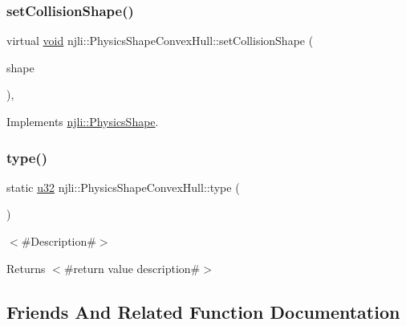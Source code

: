 \subsubsection{\texorpdfstring{set\+Collision\+Shape()}{setCollisionShape()}}
{\footnotesize\ttfamily virtual \mbox{\hyperlink{_thread_8h_af1e856da2e658414cb2456cb6f7ebc66}{void}} njli\+::\+Physics\+Shape\+Convex\+Hull\+::set\+Collision\+Shape (\begin{DoxyParamCaption}\item[{const bt\+Collision\+Shape \&}]{shape }\end{DoxyParamCaption})\hspace{0.3cm}{\ttfamily [protected]}, {\ttfamily [virtual]}}



Implements \mbox{\hyperlink{classnjli_1_1_physics_shape_a441e82a42f3b588a409c3b6c41288abd}{njli\+::\+Physics\+Shape}}.

\mbox{\label{classnjli_1_1_physics_shape_convex_hull_a44c6ade4db7be6193253e6a364aa9713}} 
\subsubsection{\texorpdfstring{type()}{type()}}
{\footnotesize\ttfamily static \mbox{\hyperlink{_util_8h_a10e94b422ef0c20dcdec20d31a1f5049}{u32}} njli\+::\+Physics\+Shape\+Convex\+Hull\+::type (\begin{DoxyParamCaption}{ }\end{DoxyParamCaption})\hspace{0.3cm}{\ttfamily [static]}}

$<$\#\+Description\#$>$

\begin{DoxyReturn}{Returns}
$<$\#return value description\#$>$ 
\end{DoxyReturn}


\subsection{Friends And Related Function Documentation}
\mbox{\label{classnjli_1_1_physics_shape_convex_hull_acb96ebb09abe8f2a37a915a842babfac}} 

